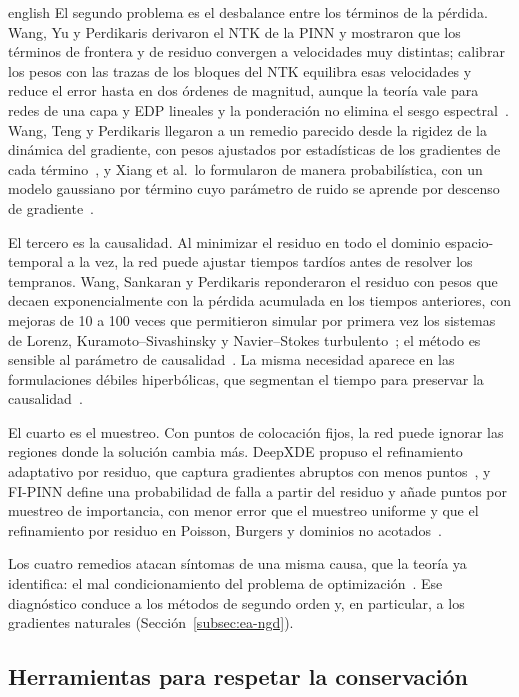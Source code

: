 \documentclass[../0000.tex]{subfiles}
\begin{document}
\begin{hyphenrules}{english}
El segundo problema es el desbalance entre los términos de la pérdida. Wang, Yu y Perdikaris derivaron el NTK de la PINN y mostraron que los términos de frontera y de residuo convergen a velocidades muy distintas; calibrar los pesos con las trazas de los bloques del NTK equilibra esas velocidades y reduce el error hasta en dos órdenes de magnitud, aunque la teoría vale para redes de una capa y EDP lineales y la ponderación no elimina el sesgo espectral~\cite{wang2022ntk}. Wang, Teng y Perdikaris llegaron a un remedio parecido desde la rigidez de la dinámica del gradiente, con pesos ajustados por estadísticas de los gradientes de cada término~\cite{wang2021gradient}, y Xiang et al.\ lo formularon de manera probabilística, con un modelo gaussiano por término cuyo parámetro de ruido se aprende por descenso de gradiente~\cite{xiang2022self}.

El tercero es la causalidad. Al minimizar el residuo en todo el dominio espacio-temporal a la vez, la red puede ajustar tiempos tardíos antes de resolver los tempranos. Wang, Sankaran y Perdikaris reponderaron el residuo con pesos que decaen exponencialmente con la pérdida acumulada en los tiempos anteriores, con mejoras de 10 a 100 veces que permitieron simular por primera vez los sistemas de Lorenz, Kuramoto--Sivashinsky y Navier--Stokes turbulento~\cite{wang2024causality}; el método es sensible al parámetro de causalidad~\cite{wang2023expert}. La misma necesidad aparece en las formulaciones débiles hiperbólicas, que segmentan el tiempo para preservar la causalidad~\cite{chaumet2024improving}.

El cuarto es el muestreo. Con puntos de colocación fijos, la red puede ignorar las regiones donde la solución cambia más. DeepXDE propuso el refinamiento adaptativo por residuo, que captura gradientes abruptos con menos puntos~\cite{lu2021deepxde}, y FI-PINN define una probabilidad de falla a partir del residuo y añade puntos por muestreo de importancia, con menor error que el muestreo uniforme y que el refinamiento por residuo en Poisson, Burgers y dominios no acotados~\cite{gao2023failure}.

Los cuatro remedios atacan síntomas de una misma causa, que la teoría ya identifica: el mal condicionamiento del problema de optimización~\cite{deryck2024acta,zhang2026physics}. Ese diagnóstico conduce a los métodos de segundo orden y, en particular, a los gradientes naturales (Sección~\ref{subsec:ea-ngd}).

\subsection{Herramientas para respetar la conservación}
\label{subsec:ea-cons}


\end{hyphenrules}
\end{document}
